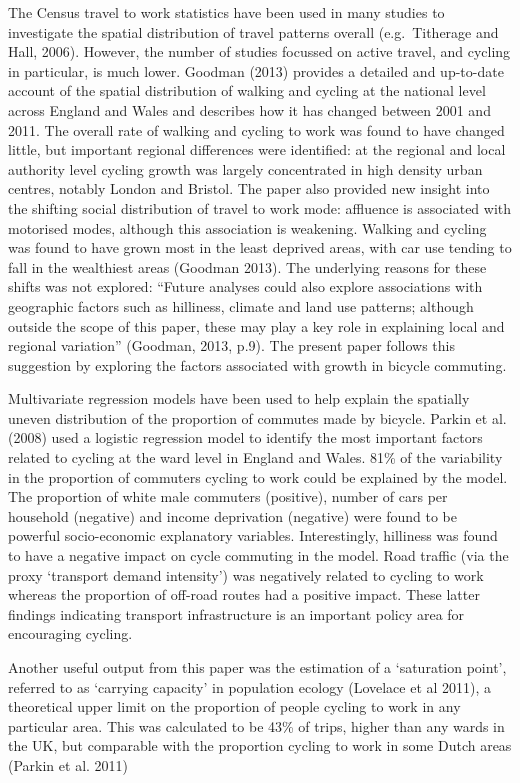 The Census travel to work statistics have been used in many studies to
investigate the spatial distribution of travel patterns overall
(e.g.~Titherage and Hall, 2006). However, the number of studies focussed
on active travel, and cycling in particular, is much lower. Goodman
(2013) provides a detailed and up-to-date account of the spatial
distribution of walking and cycling at the national level across England
and Wales and describes how it has changed between 2001 and 2011. The
overall rate of walking and cycling to work was found to have changed
little, but important regional differences were identified: at the
regional and local authority level cycling growth was largely
concentrated in high density urban centres, notably London and Bristol.
The paper also provided new insight into the shifting social
distribution of travel to work mode: affluence is associated with
motorised modes, although this association is weakening. Walking and
cycling was found to have grown most in the least deprived areas, with
car use tending to fall in the wealthiest areas (Goodman 2013). The
underlying reasons for these shifts was not explored: ``Future analyses
could also explore associations with geographic factors such as
hilliness, climate and land use patterns; although outside the scope of
this paper, these may play a key role in explaining local and regional
variation'' (Goodman, 2013, p.9). The present paper follows this
suggestion by exploring the factors associated with growth in bicycle
commuting.

Multivariate regression models have been used to help explain the
spatially uneven distribution of the proportion of commutes made by
bicycle. Parkin et al. (2008) used a logistic regression model to
identify the most important factors related to cycling at the ward level
in England and Wales. 81\% of the variability in the proportion of
commuters cycling to work could be explained by the model. The
proportion of white male commuters (positive), number of cars per
household (negative) and income deprivation (negative) were found to be
powerful socio-economic explanatory variables. Interestingly, hilliness
was found to have a negative impact on cycle commuting in the model.
Road traffic (via the proxy `transport demand intensity') was negatively
related to cycling to work whereas the proportion of off-road routes had
a positive impact. These latter findings indicating transport
infrastructure is an important policy area for encouraging cycling.

Another useful output from this paper was the estimation of a
`saturation point', referred to as `carrying capacity' in population
ecology (Lovelace et al 2011), a theoretical upper limit on the
proportion of people cycling to work in any particular area. This was
calculated to be 43\% of trips, higher than any wards in the UK, but
comparable with the proportion cycling to work in some Dutch areas
(Parkin et al. 2011)

